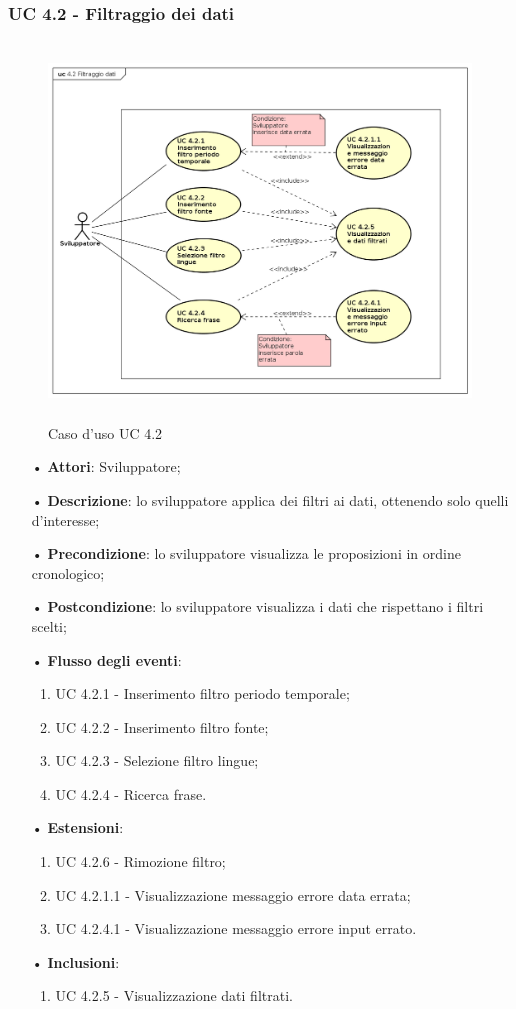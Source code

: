 \subsubsection{UC 4.2 - Filtraggio dei dati}
\begin{figure}[H]
\centering
\includegraphics[width=17cm, height=10cm]{img/UC420.png} 
\caption{Caso d'uso UC 4.2}\label{fig:420}
\end{figure}
\begin{itemize}
\item[•]\textbf{Attori}: Sviluppatore;
\item[•]\textbf{Descrizione}: lo sviluppatore applica dei filtri ai dati, ottenendo solo quelli d'interesse;
\item[•]\textbf{Precondizione}: lo sviluppatore visualizza le proposizioni in ordine cronologico;
\item[•]\textbf{Postcondizione}: lo sviluppatore visualizza i dati che rispettano i filtri scelti;
\item[•]\textbf{Flusso degli eventi}:
\begin{enumerate}
\item UC 4.2.1 - Inserimento filtro periodo temporale;
\item UC 4.2.2 - Inserimento filtro {fonte};
\item UC 4.2.3 - Selezione filtro lingue;
\item UC 4.2.4 - Ricerca frase.
\end{enumerate}
\item[•]\textbf{Estensioni}:
\begin{enumerate}
	\item UC 4.2.6 - Rimozione filtro;
	\item UC 4.2.1.1 - Visualizzazione messaggio errore data errata;
	\item UC 4.2.4.1 - Visualizzazione messaggio errore input errato.
\end{enumerate}
\item[•]\textbf{Inclusioni}:
\begin{enumerate}
\item UC 4.2.5 - Visualizzazione dati filtrati.
\end{enumerate}
\end{itemize}
